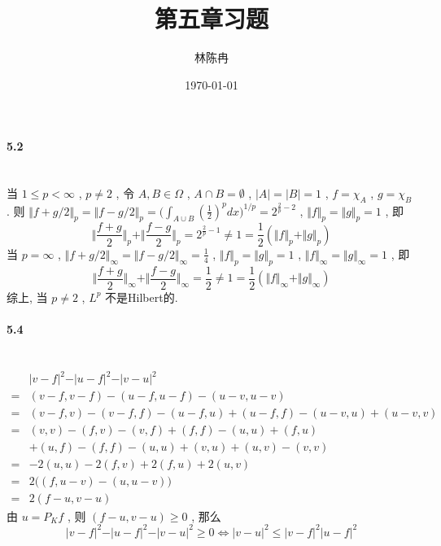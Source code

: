 \documentclass[a4paper, UTF8]{ctexart}				%
\title{第五章习题}
\author{林陈冉}
\date{\today}
\numberwithin{equation}{section}				%
\begin{document}
	\maketitle										%
	\paragraph{5.2}\quad\\
	\indent 当 $1 \le p < \infty$ , $p \neq 2$ , 令 $A, B \in \Omega$ , $A \cap B = \emptyset$ , $\vert{A}\vert = \vert{B}\vert = 1$ , $f = \chi_A$ , $g = \chi_B$ . 则 $\Vert{f + g / 2}\Vert_p = \Vert{f - g / 2}\Vert_p = \Big( \int^{ }_{A \cup B} (\frac{1}{2})^p dx \Big)^{1/p} = 2^{\frac{2}{p} - 2}$ , $\Vert{f}\Vert_p = \Vert{g}\Vert_p = 1$ , 即
	\[
		\Vert{\frac{f + g}{2}}\Vert_p + \Vert{\frac{f - g}{2}}\Vert_p  = 2^{\frac{2}{p} - 1} \neq 1 = \frac{1}{2} (\Vert{f}\Vert_p + \Vert{g}\Vert_p)
	\]    
	当 $p = \infty$ , $\Vert{f + g / 2}\Vert_\infty = \Vert{f - g / 2}\Vert_\infty = \frac{1}{4}$ , $\Vert{f}\Vert_p = \Vert{g}\Vert_p = 1$ , $\Vert{f}\Vert_\infty = \Vert{g}\Vert_\infty = 1$ , 即 
	\[
		\Vert{\frac{f + g}{2}}\Vert_\infty + \Vert{\frac{f - g}{2}}\Vert_\infty  = \frac{1}{2} \neq 1 = \frac{1}{2} (\Vert{f}\Vert_\infty + \Vert{g}\Vert_\infty)
	\]   
	综上, 当 $p \neq 2$ , $L^p$ 不是Hilbert的.\\

	\paragraph{5.4}\, 
	\begin{equation*}
		\begin{split}
				& \vert{v - f}\vert^2 - \vert{u - f }\vert^2 - \vert{v - u}\vert^2\\
			=   & ({v - f},{v - f}) - ({u - f},{u - f}) - ({u - v},{u - v})\\
			=   & ({v - f},{v}) - ({v - f},{f}) - ({u - f},{u}) + ({u - f},{f}) - ({u - v},{u}) + ({u - v},{v})\\
			=   & ({v},{v}) - ({f},{v}) - ({v},{f}) + ({f},{f}) -({u},{u}) + ({f},{u})\\
				& + ({u},{f}) - ({f},{f}) - ({u},{u}) + ({v},{u}) + ({u},{v}) - ({v},{v})\\
			=   & -2 ({u},{u}) - 2 ({f},{v}) + 2 ({f},{u}) + 2 ({u},{v})\\
			=   & 2\Big( ({f},{u - v}) - ({u},{u - v}) \Big)\\
			=   & 2 ({f -u},{v - u})
		\end{split}
	\end{equation*}
	由 $u = P_K f$ , 则 $({f -u},{v - u}) \ge 0$ , 那么
	\[
		\vert{v - f}\vert^2 - \vert{u - f }\vert^2 - \vert{v - u}\vert^2 \ge 0 \Leftrightarrow \vert{v - u}\vert^2 \le \vert{v - f}\vert^2 \vert{u - f }\vert^2
	\]
	
\end{document}
